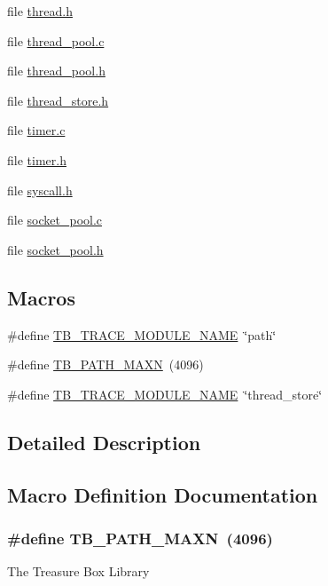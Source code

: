 \begin{DoxyCompactItemize}
file \hyperlink{thread_8h}{thread.\-h}
\item 
file \hyperlink{thread__pool_8c}{thread\-\_\-pool.\-c}
\item 
file \hyperlink{thread__pool_8h}{thread\-\_\-pool.\-h}
\item 
file \hyperlink{thread__store_8h}{thread\-\_\-store.\-h}
\item 
file \hyperlink{timer_8c}{timer.\-c}
\item 
file \hyperlink{timer_8h}{timer.\-h}
\item 
file \hyperlink{syscall_8h}{syscall.\-h}
\item 
file \hyperlink{socket__pool_8c}{socket\-\_\-pool.\-c}
\item 
file \hyperlink{socket__pool_8h}{socket\-\_\-pool.\-h}
\end{DoxyCompactItemize}
\subsection*{Macros}
\begin{DoxyCompactItemize}
\item 
\#define \hyperlink{group__platform_ga2aa61763aba311653f75dfdea928da4e}{T\-B\-\_\-\-T\-R\-A\-C\-E\-\_\-\-M\-O\-D\-U\-L\-E\-\_\-\-N\-A\-M\-E}~\char`\"{}path\char`\"{}
\item 
\#define \hyperlink{group__platform_gabc21207a13e2a620a4c41485e57d8f02}{T\-B\-\_\-\-P\-A\-T\-H\-\_\-\-M\-A\-X\-N}~(4096)
\item 
\#define \hyperlink{group__platform_ga2aa61763aba311653f75dfdea928da4e}{T\-B\-\_\-\-T\-R\-A\-C\-E\-\_\-\-M\-O\-D\-U\-L\-E\-\_\-\-N\-A\-M\-E}~\char`\"{}thread\-\_\-store\char`\"{}
\end{DoxyCompactItemize}


\subsection{Detailed Description}


\subsection{Macro Definition Documentation}
\hypertarget{group__platform_gabc21207a13e2a620a4c41485e57d8f02}{
\subsubsection[{T\-B\-\_\-\-P\-A\-T\-H\-\_\-\-M\-A\-X\-N}]{\setlength{\rightskip}{0pt plus 5cm}\#define T\-B\-\_\-\-P\-A\-T\-H\-\_\-\-M\-A\-X\-N~(4096)}}\label{group__platform_gabc21207a13e2a620a4c41485e57d8f02}
The Treasure Box Library

